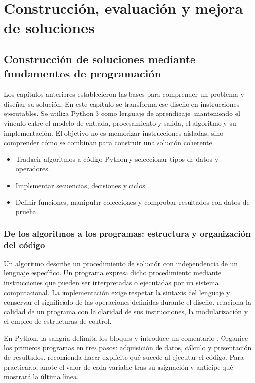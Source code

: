 \part{Construcción, evaluación y mejora de soluciones}

\chapter{Construcción de soluciones mediante fundamentos de programación}
\label{cap:03-fundamentos-de-programacion}

Los capítulos anteriores establecieron las bases para comprender un problema y diseñar su solución. En este capítulo se transforma ese diseño en instrucciones ejecutables. Se utiliza Python 3 como lenguaje de aprendizaje, manteniendo el vínculo entre el modelo de entrada, procesamiento y salida, el algoritmo y su implementación. El objetivo no es memorizar instrucciones aisladas, sino comprender cómo se combinan para construir una solución coherente.

\begin{resultados}
  \begin{itemize}
    \item Traducir algoritmos a código Python y seleccionar tipos de datos y operadores.
    \item Implementar secuencias, decisiones y ciclos.
    \item Definir funciones, manipular colecciones y comprobar resultados con datos de prueba.
  \end{itemize}
\end{resultados}

\section{De los algoritmos a los programas: estructura y organización del código}

Un algoritmo describe un procedimiento de solución con independencia de un lenguaje específico. Un programa expresa dicho procedimiento mediante instrucciones que pueden ser interpretadas o ejecutadas por un sistema computacional. La implementación exige respetar la sintaxis del lenguaje y conservar el significado de las operaciones definidas durante el diseño. \textcite[caps.~2 y 3]{farrell2013} relaciona la calidad de un programa con la claridad de sus instrucciones, la modularización y el empleo de estructuras de control.

En Python, la sangría delimita los bloques y \Codigo{\#} introduce un comentario \parencite{python312tutorial}. Organice los primeros programas en tres pasos: adquisición de datos, cálculo y presentación de resultados. \textcite{sorva2013} recomienda hacer explícito qué sucede al ejecutar el código. Para practicarlo, anote el valor de cada variable tras su asignación y anticipe qué mostrará la última línea.

